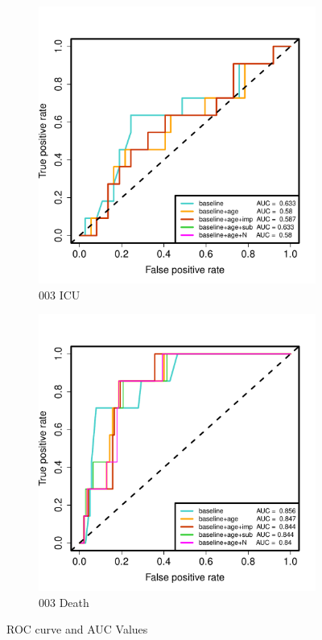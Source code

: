 \documentclass[12pt,twoside]{article}
\begin{document}
\begin{figure}[h]
        \begin{subfigure}{.475\textwidth}
            \includegraphics[width=\textwidth]{003ICU_AUC_constrained.pdf}
            \caption{003 ICU}
        \end{subfigure}\hfill
                \begin{subfigure}{.475\textwidth}
            \includegraphics[width=\textwidth]{003Death_AUC_constrained.pdf}
            \caption{003 Death}
        \end{subfigure}\hfill
        \caption{ROC curve and AUC Values}
        
        \end{figure}

        
    
\end{document}
